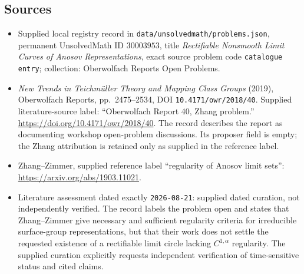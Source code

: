 \documentclass[11pt]{article}
\begin{document}
\subsection{Sources}
\begin{itemize}
\item Supplied local registry record in \texttt{data/unsolvedmath/problems.json}, permanent UnsolvedMath ID \(30003953\), title \emph{Rectifiable Nonsmooth Limit Curves of Anosov Representations}, exact source problem code \texttt{catalogue entry}; collection: Oberwolfach Reports Open Problems.
\item \emph{New Trends in Teichmüller Theory and Mapping Class Groups} (2019), Oberwolfach Reports, pp.\ 2475--2534, DOI \texttt{10.4171/owr/2018/40}. Supplied literature-source label: ``Oberwolfach Report 40, Zhang problem.'' \url{https://doi.org/10.4171/owr/2018/40}. The record describes the report as documenting workshop open-problem discussions. Its proposer field is empty; the Zhang attribution is retained only as supplied in the reference label.
\item Zhang--Zimmer, supplied reference label ``regularity of Anosov limit sets'': \url{https://arxiv.org/abs/1903.11021}.
\item Literature assessment dated exactly \texttt{2026-08-21}: supplied dated curation, not independently verified. The record labels the problem open and states that Zhang--Zimmer give necessary and sufficient regularity criteria for irreducible surface-group representations, but that their work does not settle the requested existence of a rectifiable limit circle lacking \(C^{1,\alpha}\) regularity. The supplied curation explicitly requests independent verification of time-sensitive status and cited claims.
\end{itemize}
\end{document}
